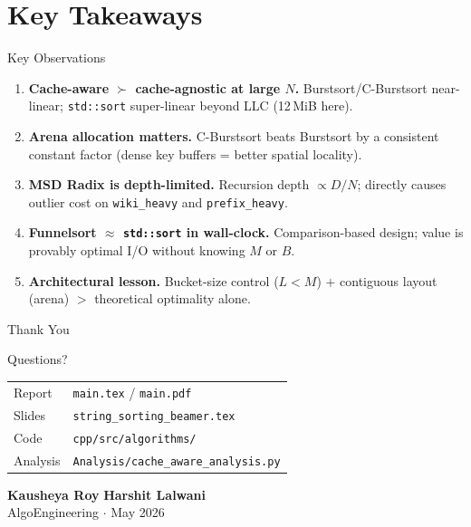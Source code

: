 \documentclass[aspectratio=169]{beamer}
\begin{document}
\section{Key Takeaways}

\begin{frame}{Key Observations}
  \begin{enumerate}
    \item \textbf{Cache-aware $\succ$ cache-agnostic at large $N$.}
          Burstsort/C-Burstsort near-linear; \texttt{std::sort} super-linear
          beyond LLC (12\,MiB here).
    \item \textbf{Arena allocation matters.}
          C-Burstsort beats Burstsort by a consistent constant factor
          (dense key buffers = better spatial locality).
    \item \textbf{MSD Radix is depth-limited.}
          Recursion depth $\propto D/N$; directly causes outlier cost
          on \texttt{wiki\_heavy} and \texttt{prefix\_heavy}.
    \item \textbf{Funnelsort $\approx$ \texttt{std::sort} in wall-clock.}
          Comparison-based design; value is provably optimal I/O
          without knowing $M$ or $B$.
    \item \textbf{Architectural lesson.}
          Bucket-size control ($L < M$) $+$ contiguous layout (arena)
          $>$ theoretical optimality alone.
  \end{enumerate}
\end{frame}

\begin{frame}{Thank You}
  \begin{center}
    {\Large Questions?}
    \vspace{1.5em}

    \begin{tabular}{ll}
      Report & \texttt{main.tex} / \texttt{main.pdf} \\
      Slides & \texttt{string\_sorting\_beamer.tex} \\
      Code   & \texttt{cpp/src/algorithms/} \\
      Analysis & \texttt{Analysis/cache\_aware\_analysis.py} \\
    \end{tabular}
    \vspace{1.5em}

    \textbf{Kausheya Roy} \quad \textbf{Harshit Lalwani}\\
    AlgoEngineering $\cdot$ May 2026
  \end{center}
\end{frame}
\end{document}
